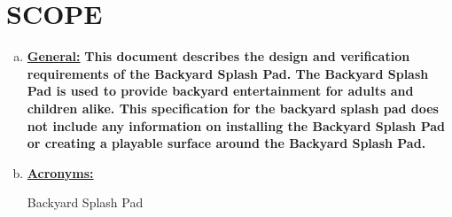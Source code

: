 \section{SCOPE}



\begin{enumerate}[(a)]
	\item \textbf{\underline{General:}} \textbf{This document describes the design and verification requirements of the Backyard Splash Pad. The Backyard Splash Pad is used to provide backyard entertainment for adults and children alike. This specification for the backyard splash pad does not include any information on installing the Backyard Splash Pad or creating a playable surface around the Backyard Splash Pad.}
\bigskip



	\item \textbf{\underline{Acronyms:}}
	
	 Backyard Splash Pad
	


\end{enumerate}

